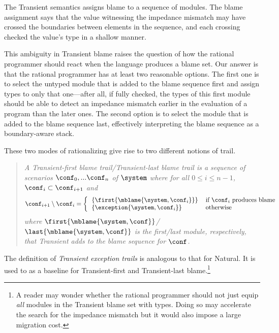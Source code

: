 
The Transient semantics assigns blame to a sequence of modules. The blame
assignment says that the value witnessing the impedance mismatch may have
crossed the boundaries between elements in the sequence, and each crossing
checked the value's type in a shallow manner.

This ambiguity in Transient blame raises the question of how the rational
programmer should react when the language produces a blame set. Our answer
is that the rational programmer has at least two reasonable options. The first
one is to select the untyped module that is added to the blame sequence first and
assign types to only that one---after all, if fully checked, the types of this
first module should be able to detect an impedance mismatch earlier in the
evaluation of a program than the later ones. The second option is to select the
module that is added to the blame sequence last, effectively interpreting the
blame sequence as a boundary-aware stack.

These two modes of rationalizing give rise to two different notions of trail.

\begin{quote}
\it A \emph{Transient-first blame trail}/\emph{Transient-last blame trail} is a sequence of scenarios
$\conf_0,...\conf_n$ of $\system$ where for all $0 \leq i \leq n - 1$,
$\conf_i \subset \conf_{i+1}$ and
\[ \conf_{i+1} \setminus \conf_i = %
\left\{ %
\begin{tabular}{ll} %
$\{\first{\mblame{\system, \conf_i}}\}$  & if $\conf_i$ produces blame \\ %
$\{\exception{\system, \conf_i}\}$     & otherwise \\ %
\end{tabular} \right. %
\]
where $\first{\mblame{\system, \conf}}$/$\last{\mblame{\system, \conf}}$ is the
first/last module, respectively,  that Transient adds to the blame sequence for $\conf$.
\end{quote}

The definition of \emph{Transient exception trails} is analogous to that for
Natural. It is used to as a baseline for Transient-first and Transient-last
blame.\footnote{A reader may wonder whether the rational programmer
should not just equip {\em all\/} modules in the Transient blame set
with types. Doing so may accelerate the search for the impedance
mismatch but it would also impose a large migration cost.}
